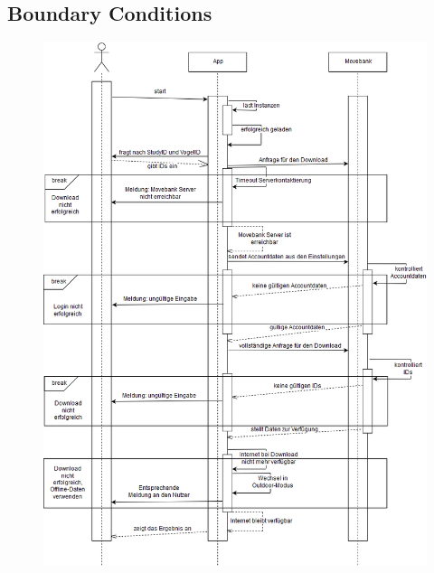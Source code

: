 \documentclass[12pt]{article} %
\begin{document}
\subsection{Boundary Conditions}
\begin{figure}[H]
	\hfill
		\includegraphics[width =  0.95 \textwidth]{Diagramme/BounCond.png}
	\hspace*{\fill}
\end{figure}
\pagebreak
\end{document}
